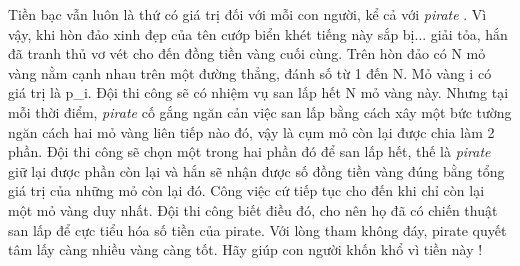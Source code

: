Tiền bạc vẫn luôn là thứ có giá trị đối với mỗi con người, kể cả với   \emph{    pirate   }   . Vì vậy, khi hòn đảo xinh đẹp của tên cướp biển khét tiếng này sắp bị... giải tỏa, hắn đã tranh thủ vơ vét cho đến đồng tiền vàng cuối cùng. Trên hòn đảo có N mỏ vàng nằm cạnh nhau trên một đường thẳng, đánh số từ 1 đến N. Mỏ vàng i có giá trị là p\_i. Đội thi công sẽ có nhiệm vụ san lấp hết N mỏ vàng này. Nhưng tại mỗi thời điểm,   \emph{    pirate   }   cố gắng ngăn cản việc san lấp bằng cách xây một bức tường ngăn cách hai mỏ vàng liên tiếp nào đó, vậy là cụm mỏ còn lại được chia làm 2 phần. Đội thi công sẽ chọn một trong hai phần đó để san lấp hết, thế là   \emph{    pirate   }   giữ lại được phần còn lại và hắn sẽ nhận được số đồng tiền vàng đúng bằng tổng giá trị của những mỏ còn lại đó. Công việc cứ tiếp tục cho đến khi chỉ còn lại một mỏ vàng duy nhất. Đội thi công biết điều đó, cho nên họ đã có chiến thuật san lấp để cực tiểu hóa số tiền của pirate. Với lòng tham không đáy, pirate quyết tâm lấy càng nhiều vàng càng tốt. Hãy giúp con người khốn khổ vì tiền này !  

\